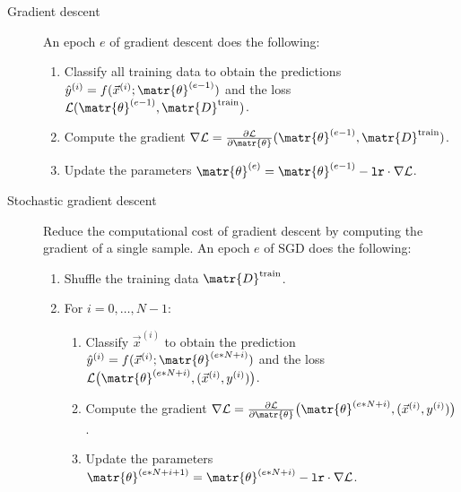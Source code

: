 \begin{description}
    \item[Gradient descent] 
        An epoch $e$ of gradient descent does the following:
        \begin{enumerate}
            \item Classify all training data to obtain the predictions $\hat{y}^{(i)} = f(\vec{x}^{(i)}; \matr{\theta}^{(e-1)})$
                and the loss $\mathcal{L}(\matr{\theta}^{(e-1)}, \matr{D}^\text{train})$.
            \item Compute the gradient $\nabla \mathcal{L} = \frac{\partial\mathcal{L}}{\partial \matr{\theta}} (\matr{\theta}^{(e-1)}, \matr{D}^\text{train})$.
            \item Update the parameters $\matr{\theta}^{(e)} = \matr{\theta}^{(e-1)} - \texttt{lr} \cdot \nabla \mathcal{L}$.
        \end{enumerate}

    \item[Stochastic gradient descent] 
        Reduce the computational cost of gradient descent by computing the gradient of a single sample.
        An epoch $e$ of SGD does the following:
        \begin{enumerate}
            \item Shuffle the training data $\matr{D}^\text{train}$.
            \item For $i = 0, \dots, N-1$:
            \begin{enumerate}
                \item Classify $\vec{x}^{(i)}$ to obtain the prediction $\hat{y}^{(i)} = f(\vec{x}^{(i)}; \matr{\theta}^{(e*N+i)})$
                and the loss $\mathcal{L}\big( \matr{\theta}^{(e*N+i)}, (\vec{x}^{(i)}, y^{(i)}) \big)$.
                \item Compute the gradient $\nabla \mathcal{L} = \frac{\partial\mathcal{L}}{\partial \matr{\theta}}\big( \matr{\theta}^{(e*N+i)}, (\vec{x}^{(i)}, y^{(i)}) \big)$.
                \item Update the parameters $\matr{\theta}^{(e*N+i+1)} = \matr{\theta}^{(e*N+i)} - \texttt{lr} \cdot \nabla \mathcal{L}$.
            \end{enumerate}
        \end{enumerate}


\end{description}

